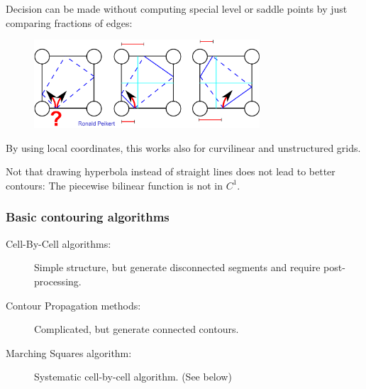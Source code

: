 Decision can be made without computing special level or saddle points by just comparing fractions of edges:
\begin{figure}[H]
    \centering
    \includegraphics[width=0.75\textwidth]{img/02_contouring_decision}
\end{figure}
By using local coordinates, this works also for curvilinear and unstructured grids.

Not that drawing hyperbola instead of straight lines does not lead to better contours: The piecewise bilinear function is not in $C^1$.

\subsubsection{Basic contouring algorithms}
\begin{description}
    \item[Cell-By-Cell algorithms:] Simple structure, but generate disconnected segments and require post-processing.
    \item[Contour Propagation methods:] Complicated, but generate connected contours.
    \item[Marching Squares algorithm:] Systematic cell-by-cell algorithm. (See below)
\end{description}

